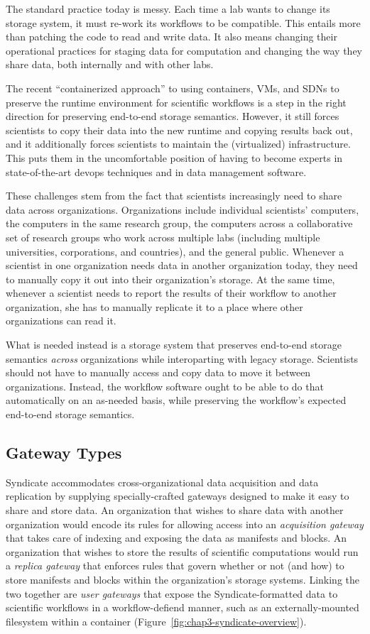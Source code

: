 The standard practice today is messy.  Each time a lab wants to change its
storage system, it must re-work its workflows to be compatible.  This entails
more than patching the code to read and write data.  It also means changing their
operational practices for staging data for computation and changing the way they
share data, both internally and with other labs.

The recent ``containerized approach'' to using containers, VMs, and
SDNs to preserve the runtime environment for scientific workflows
is a step in the right direction for preserving end-to-end storage semantics.
However, it still forces scientists to copy their data into the new
runtime and copying results back out, and it additionally forces scientists to
maintain the (virtualized) infrastructure.  This puts them in the uncomfortable
position of having to become experts in state-of-the-art devops techniques and
in data management software.

These challenges stem from the fact that scientists increasingly need to share
data across organizations.  Organizations include individual
scientists' computers, the computers in the same research group, the computers
across a collaborative set of research groups who
work across multiple labs (including multiple universities, corporations, and
countries), and the general public.  Whenever a scientist in one organization
needs data in another organization today, they need to manually copy it out into their
organization's storage.  At the same time, whenever a scientist needs to report the results
of their workflow to another organization, she has to manually replicate it to a place
where other organizations can read it.

What is needed instead is a storage system that preserves end-to-end storage
semantics \emph{across} organizations while interoparting with legacy storage.
Scientists should not have to manually access and copy data to move it between
organizations.  Instead, the workflow
software ought to be able to do that automatically on an as-needed basis,
while preserving the workflow's expected end-to-end storage semantics.

\subsection{Gateway Types}

Syndicate accommodates cross-organizational data acquisition and
data replication by supplying specially-crafted gateways designed to make it
easy to share and store data.  An organization that wishes to share data with
another organization would encode its rules for allowing access into an
\emph{acquisition gateway} that takes care of indexing and exposing the data as
manifests and blocks.  An organization that wishes to store the results of
scientific computations would run a \emph{replica gateway} that enforces rules
that govern whether or not (and how) to store manifests and blocks within the
organization's storage systems.  Linking the two together are \emph{user
gateways} that expose the Syndicate-formatted data to scientific workflows in a
workflow-defiend manner, such as an externally-mounted filesystem within a
container (Figure~\ref{fig:chap3-syndicate-overview}).

